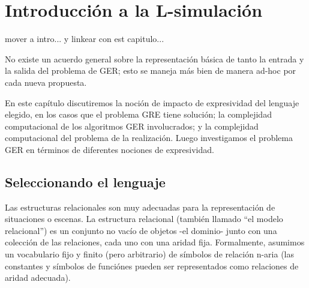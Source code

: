 \chapter{Introducci\'on a la L-simulaci\'on}
\label{sec:intro_logica}

mover a intro... y linkear con est capitulo...

No existe un acuerdo general sobre la representaci\'on b\'asica de
tanto la entrada y la salida del problema de GER; esto se maneja m\'as bien de manera ad-hoc
por cada nueva propuesta.

%
%
%
%

En este cap\'itulo discutiremos la noci\'on de impacto de expresividad del lenguaje elegido, 
en los casos que el problema GRE tiene soluci\'on; la complejidad computacional de los algoritmos GER involucrados; 
y la complejidad computacional del problema de la realizaci\'on. Luego investigamos el problema GER en t\'erminos de diferentes 
nociones de expresividad. 


\section{Seleccionando el lenguaje}


Las estructuras relacionales son muy adecuadas para la representaci\'on de situaciones o escenas. La estructura relacional (tambi\'en llamado ``el modelo relacional'') es un conjunto no vac\'io de objetos -el dominio- junto con una colecci\'on de las relaciones, cada uno con una aridad fija.
Formalmente, asumimos un vocabulario fijo y finito (pero arbitrario) de
s\'imbolos de relaci\'on n-aria (las constantes y s\'imbolos de funci\'ones pueden ser representados como relaciones de aridad adecuada). 


